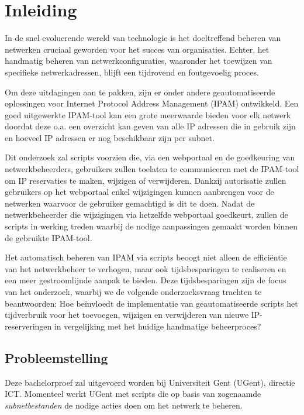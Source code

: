 
\graphicspath{ {../voorstel/img/} }

\section{Inleiding}%
\label{voorstel:inleiding}
In de snel evoluerende wereld van technologie is het doeltreffend beheren van netwerken cruciaal geworden voor het succes van organisaties. Echter, het handmatig beheren van netwerkconfiguraties, waaronder het toewijzen van specifieke netwerkadressen, blijft een tijdrovend en foutgevoelig proces.

Om deze uitdagingen aan te pakken, zijn er onder andere geautomatiseerde oplossingen voor Internet Protocol Address Management (IPAM) ontwikkeld. Een goed uitgewerkte IPAM-tool kan een grote meerwaarde bieden voor elk netwerk doordat deze o.a. een overzicht kan geven van alle IP adressen die in gebruik zijn en hoeveel IP adressen er nog beschikbaar zijn per subnet.

Dit onderzoek zal scripts voorzien die, via een webportaal en de goedkeuring van netwerkbeheerders, gebruikers zullen toelaten te communiceren met de IPAM-tool om IP reservaties te maken, wijzigen of verwijderen. Dankzij autorisatie zullen gebruikers op het webportaal enkel wijzigingen kunnen aanbrengen voor de netwerken waarvoor de gebruiker gemachtigd is dit te doen. Nadat de netwerkbeheerder die wijzigingen via hetzelfde webportaal goedkeurt, zullen de scripts in werking treden waarbij de nodige aanpassingen gemaakt worden binnen de gebruikte IPAM-tool.

Het automatisch beheren van IPAM via scripts beoogt niet alleen de efficiëntie van het netwerkbeheer te verhogen, maar ook tijdsbesparingen te realiseren en een meer gestroomlijnde aanpak te bieden. Deze tijdsbesparingen zijn de focus van het onderzoek, waarbij we de volgende onderzoeksvraag trachten te beantwoorden: Hoe beïnvloedt de implementatie van geautomatiseerde scripts het tijdverbruik voor het toevoegen, wijzigen en verwijderen van nieuwe IP-reserveringen in vergelijking met het huidige handmatige beheerproces?

\subsection{Probleemstelling}
\label{voorstel:probleemstelling}
Deze bachelorproef zal uitgevoerd worden bij Universiteit Gent (UGent), directie ICT. Momenteel werkt UGent met scripts die op basis van zogenaamde \textit{subnetbestanden} de nodige acties doen om het netwerk te beheren. 

